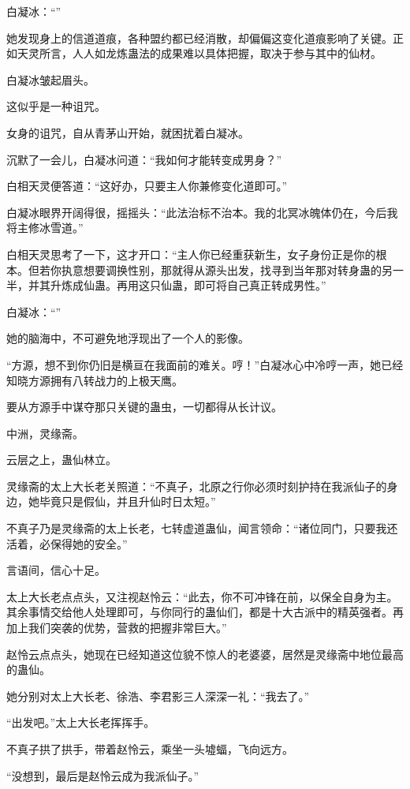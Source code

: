 \begin{this_body}
白凝冰：“”

她发现身上的信道道痕，各种盟约都已经消散，却偏偏这变化道痕影响了关键。正如天灵所言，人人如龙炼蛊法的成果难以具体把握，取决于参与其中的仙材。

白凝冰皱起眉头。

这似乎是一种诅咒。

女身的诅咒，自从青茅山开始，就困扰着白凝冰。

沉默了一会儿，白凝冰问道：“我如何才能转变成男身？”

白相天灵便答道：“这好办，只要主人你兼修变化道即可。”

白凝冰眼界开阔得很，摇摇头：“此法治标不治本。我的北冥冰魄体仍在，今后我将主修冰雪道。”

白相天灵思考了一下，这才开口：“主人你已经重获新生，女子身份正是你的根本。但若你执意想要调换性别，那就得从源头出发，找寻到当年那对转身蛊的另一半，并其升炼成仙蛊。再用这只仙蛊，即可将自己真正转成男性。”

白凝冰：“”

她的脑海中，不可避免地浮现出了一个人的影像。

“方源，想不到你仍旧是横亘在我面前的难关。哼！”白凝冰心中冷哼一声，她已经知晓方源拥有八转战力的上极天鹰。

要从方源手中谋夺那只关键的蛊虫，一切都得从长计议。

中洲，灵缘斋。

云层之上，蛊仙林立。

灵缘斋的太上大长老关照道：“不真子，北原之行你必须时刻护持在我派仙子的身边，她毕竟只是假仙，并且升仙时日太短。”

不真子乃是灵缘斋的太上长老，七转虚道蛊仙，闻言领命：“诸位同门，只要我还活着，必保得她的安全。”

言语间，信心十足。

太上大长老点点头，又注视赵怜云：“此去，你不可冲锋在前，以保全自身为主。其余事情交给他人处理即可，与你同行的蛊仙们，都是十大古派中的精英强者。再加上我们突袭的优势，营救的把握非常巨大。”

赵怜云点点头，她现在已经知道这位貌不惊人的老婆婆，居然是灵缘斋中地位最高的蛊仙。

她分别对太上大长老、徐浩、李君影三人深深一礼：“我去了。”

“出发吧。”太上大长老挥挥手。

不真子拱了拱手，带着赵怜云，乘坐一头墟蝠，飞向远方。

“没想到，最后是赵怜云成为我派仙子。”


\end{this_body}
